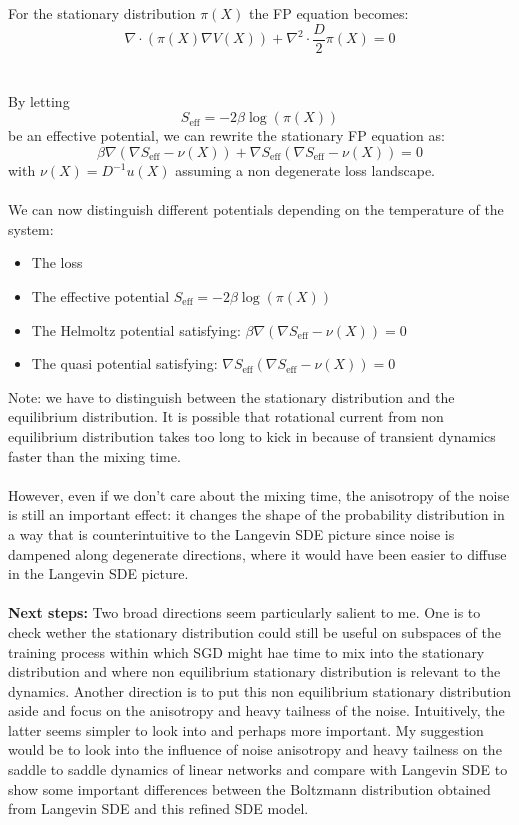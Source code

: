 \documentclass[11pt]{article}
\begin{document}
For the stationary distribution $\pi(X)$ the FP equation becomes:
\begin{equation}
    \nabla \cdot (\pi(X) \nabla V(X)) + \nabla^2\cdot\frac{D}{2} \pi(X) = 0
\end{equation}
\\
\\
By letting $$S_{\text{eff}}=-2\beta\log(\pi(X))$$ be an effective potential, we can rewrite the stationary FP equation as:
\begin{equation}
    \beta\nabla(\nabla S_{\text{eff}} - \nu(X)) + \nabla S_{\text{eff}}(\nabla S_{\text{eff}} - \nu(X))=0
\end{equation}
with $\nu(X)=D^{-1}u(X)$ assuming a non degenerate loss landscape.
\\
\\
We can now distinguish different potentials depending on the temperature of the system:
\begin{itemize}
    \item The loss
    \item The effective potential $S_{\text{eff}}=-2\beta\log(\pi(X))$
    \item The Helmoltz potential satisfying: $\beta\nabla(\nabla S_{\text{eff}} - \nu(X))=0$
    \item The quasi potential satisfying: $\nabla S_{\text{eff}}(\nabla S_{\text{eff}} - \nu(X))=0$
\end{itemize}
Note: we have to distinguish between the stationary distribution and the equilibrium distribution. It is possible that rotational current from non equilibrium distribution takes too long to kick in because of transient dynamics faster than the mixing time.
\\
\\ 
However, even if we don't care about the mixing time, the anisotropy of the noise is still an important effect: it changes the shape of the probability distribution in a way that is counterintuitive to the Langevin SDE picture since noise is dampened along degenerate directions, where it would have been easier to diffuse in the Langevin SDE picture.
\\
\\
\textbf{Next steps:} Two broad directions seem particularly salient to me. One is to check wether the stationary distribution could still be useful on subspaces of the training process within which SGD might hae time to mix into the stationary distribution and where non equilibrium stationary distribution is relevant to the dynamics. Another direction is to put this non equilibrium stationary distribution aside and focus on the anisotropy and heavy tailness of the noise. Intuitively, the latter seems simpler to look into and perhaps more important. My suggestion would be to look into the influence of noise anisotropy and heavy tailness on the saddle to saddle dynamics of linear networks and compare with Langevin SDE to show some important differences between the Boltzmann distribution obtained from Langevin SDE and this refined SDE model.
\end{document}
